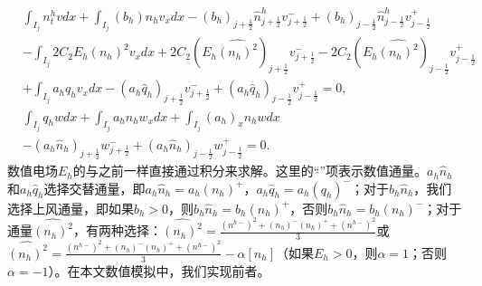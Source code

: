 \begin{align}
     & \int_{I_{j}} n_{t}^{h} v d x+\int_{I_{j}}\left(b_h\right) n_h v_{x} d x                                                                    -\left(b_h\right)_{j+\frac{1}{2}} \hat{n}_{j+\frac{1}{2}}^{h} v_{j+\frac{1}{2}}^{-}  +\left(b_h\right)_{j-\frac{1}{2}} \hat{n}_{j-\frac{1}{2}}^{h} v_{j-\frac{1}{2}}^{+}                                                                                                                                   \nonumber \\
     & -\int_{I_{j}} 2 C_{2} E_h\left(n_h\right)^{2} v_{x} d x+2 C_{2}\left(E_h \widehat{\left(n_h\right)^{2}}\right)_{j+\frac{1}{2}} v_{j+\frac{1}{2}}^{-}-2 C_{2}\left(E_h \widehat{\left(n_h\right)^{2}}\right)_{j-\frac{1}{2}} v_{j-\frac{1}{2}}^{+} \nonumber                                                                                                                                                                                                     \\
     & +\int_{I_{j}} a_h q_h v_{x} d x -\left(a_h \hat{q}_{h}\right)_{j+\frac{1}{2}} v_{j+\frac{1}{2}}^{-}+\left(a_h \hat{q}_{h}\right)_{j-\frac{1}{2}} v_{j-\frac{1}{2}}^{+}=0,             \label{eq:HFRewrittenLDGa}                                                                                                                                                                                                                                                \\
     & \int_{I_{j}} q_h w d x+\int_{I_{j}} a_h n_h w_{x} d x+\int_{I_{j}}\left(a_h\right)_{x} n_h w d x                        \nonumber                                                                                                                                                                                                                                                                                                                               \\
     & -\left(a_h \hat{n}_{h}\right)_{j+\frac{1}{2}} w_{j+\frac{1}{2}}^{-}+\left(a_h \hat{n}_{h}\right)_{j-\frac{1}{2}} w_{j-\frac{1}{2}}^{+}=0 .\label{eq:HFRewrittenLDGb}
\end{align}
数值电场$E_h$的与之前一样直接通过积分来求解。这里的“$\widehat{}$”项表示数值通量。$a_h \hat{n}_{h}$和$a_h \hat{q}_{h}$选择交替通量，即$a_h \hat{n}_{h}=a_h\left(n_h\right)^{+}$，$a_h \hat{q}_{h}=a_h\left(q_h\right)^{-}$；对于$b_h \hat{n}_{h}$，我们选择上风通量，即如果$b_h>0$，则$b_h \hat{n}_{h}=b_h\left(n_h\right)^{+}$，否则$b_h \hat{n}_{h}=b_h\left(n_h\right)^{-}$；对于通量$\widehat{\left(n_h\right)^{2}}$，有两种选择：$\widehat{\left(n_h\right)^{2}}=\frac{\left(n^{h-}\right)^{2}+\left(n_h\right)^{-}\left(n_h\right)^{+}+\left(n^{h-}\right)^{2}}{3}$或$\widehat{\left(n_h\right)^{2}}=\frac{\left(n^{h-}\right)^{2}+\left(n_h\right)^{-}\left(n_h\right)^{+}+\left(n^{h-}\right)^{2}}{3}-\alpha\left[n_h\right]$（如果$E_h>0$，则$\alpha=1$；否则$\alpha=-1$）。在本文数值模拟中，我们实现前者。
